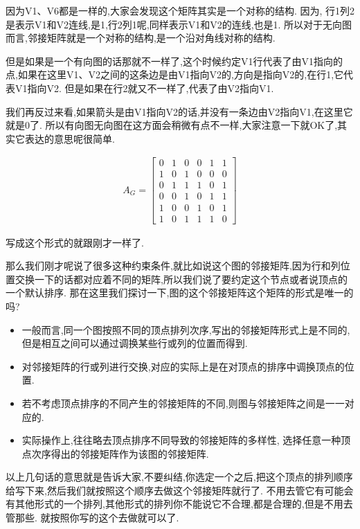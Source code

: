 因为V1、V6都是一样的,大家会发现这个矩阵其实是一个对称的结构. 因为, 行1列2是表示V1和V2连线,是1,行2列1呢,同样表示V1和V2的连线,也是1. 所以对于无向图而言,邻接矩阵就是一个对称的结构,是一个沿对角线对称的结构. 

但是如果是一个有向图的话那就不一样了,这个时候约定V1行代表了由V1指向的点,如果在这里V1、V2之间的这条边是由V1指向V2的,方向是指向V2的,在行1,它代表V1指向V2. 但是如果在行2就又不一样了,代表了由V2指向V1. 

我们再反过来看,如果箭头是由V1指向V2的话,并没有一条边由V2指向V1,在这里它就是0了. 所以有向图无向图在这方面会稍微有点不一样,大家注意一下就OK了,其实它表达的意思呢很简单. 

\begin{align*}
  A_G = \begin{bmatrix} 
  0 & 1 & 0 & 0 & 1 & 1 \\  
  1 & 0 & 1 & 0 & 0 & 0 \\
  0 & 1 & 1 & 1 & 0 & 1 \\ 
  0 & 0 & 1 & 0 & 1 & 1 \\ 
  1 & 0 & 0 & 1 & 0 & 1 \\
  1 & 0 & 1 & 1 & 1 & 0
  \end{bmatrix}
\end{align*}

写成这个形式的就跟刚才一样了. 

那么我们刚才呢说了很多这种约束条件,就比如说这个图的邻接矩阵,因为行和列位置交换一下的话都对应着不同的矩阵,所以我们说了要约定这个节点或者说顶点的一个默认排序. 那在这里我们探讨一下,图的这个邻接矩阵这个矩阵的形式是唯一的吗? 

\begin{itemize}
  \item 一般而言,同一个图按照不同的顶点排列次序,写出的邻接矩阵形式上是不同的,但是相互之间可以通过调换某些行或列的位置而得到. 
  \item 对邻接矩阵的行或列进行交换,对应的实际上是在对顶点的排序中调换顶点的位置. 
  \item 若不考虑顶点排序的不同产生的邻接矩阵的不同,则图与邻接矩阵之间是一一对应的. 
  \item 实际操作上,往往略去顶点排序不同导致的邻接矩阵的多样性, 选择任意一种顶点次序得出的邻接矩阵作为该图的邻接矩阵. 
\end{itemize}

以上几句话的意思就是告诉大家,不要纠结,你选定一个之后,把这个顶点的排列顺序给写下来,然后我们就按照这个顺序去做这个邻接矩阵就行了. 不用去管它有可能会有其他形式的一个排列,其他形式的排列你不能说它不合理,都是合理的,但是不用去管那些. 就按照你写的这个去做就可以了. 

